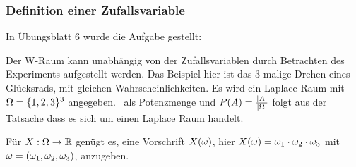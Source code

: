 \subsubsection{Definition einer Zufallsvariable}
In Übungsblatt 6 wurde die Aufgabe gestellt:

Der W-Raum kann unabhängig von der Zufallsvariablen durch Betrachten des Experiments
aufgestellt werden.
Das Beispiel hier ist das 3-malige Drehen eines Glücksrads, mit gleichen Wahrscheinlichkeiten.
Es wird ein Laplace Raum mit $\Omega = \{1,2,3\}^3$ angegeben. \tS\ als Potenzmenge und
$P(A) = \frac{|A|}{|\Omega|}$ folgt aus der Tatsache dass es sich um einen Laplace Raum handelt.

Für $X: \Omega \to \mathbb{R}$ genügt es, eine Vorschrift $X(\omega)$, hier
$X(\omega) = \omega_1 \cdot \omega_2 \cdot \omega_3$ mit $\omega = (\omega_1, \omega_2, \omega_3)$, anzugeben.
